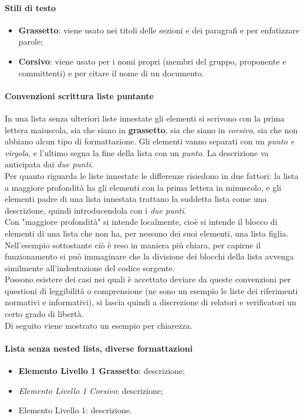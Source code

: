 		\paragraph*{Stili di testo} %
			\begin{itemize}
				\item \textbf{Grassetto}: viene usato nei titoli delle sezioni e dei paragrafi e per enfatizzare parole;
				\item \textbf{Corsivo}: viene usato per i nomi propri (membri del gruppo,  proponente e committenti) e per citare il nome di un documento.
			\end{itemize}
	
		\paragraph*{Convenzioni scrittura liste puntante} \aCapo{}
		In una lista senza ulteriori liste innestate gli elementi si scrivono con la prima lettera
		maiuscola, sia che siano in \textbf{grassetto}, sia che siano in \textit{corsivo}, sia che non
		abbiano alcun tipo di formattazione. Gli elementi vanno separati con un \textit{punto e virgola}, e 
		l'ultimo segna la fine della lista con un \textit{punto}. La descrizione va anticipata dai \textit{due punti}.\\
		Per quanto riguarda le liste innestate le differenze risiedono in due fattori: la lista
		a maggiore profondità ha gli elementi con la prima lettera in minuscolo, e gli elementi padre
		di una lista innestata trattano la suddetta lista come una descrizione, quindi introducendola
		con i \textit{due punti}.\\
		Con "maggiore profondità" si intende localmente, cioè si intende il blocco di elementi di una
		lista che non ha, per nessuno dei suoi elementi, una lista figlia. Nell'esempio sottostante ciò
		è reso in maniera più chiara, per capirne il funzionamento si può immaginare che la divisione 
		dei blocchi della lista avvenga similmente all'indentazione del codice sorgente.\\
		Possono esistere dei casi nei quali è accettato deviare da queste convenzioni per questioni di 
		leggibilità o comprensione (ne sono un esempio le liste dei riferimenti normativi e informativi),
		si lascia quindi a discrezione di relatori e verificatori un certo grado di libertà.\\
		Di seguito viene mostrato un esempio per chiarezza. 
		\paragraph*{Lista senza nested lists, diverse formattazioni}
		\begin{itemize}
			\item \textbf{Elemento Livello 1 Grassetto}: descrizione;
			\item \textit{Elemento Livello 1 Corsivo}: descrizione;
			\item Elemento Livello 1: descrizione.
		\end{itemize}

